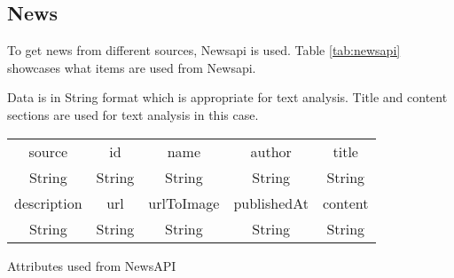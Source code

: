 \subsection{News}\label{News}

To get news from different sources, Newsapi \parencite{web:Newsapi} is used. Table \ref{tab:newsapi} showcases what items are used from Newsapi.

Data is in String format which is appropriate for text analysis. Title and content sections are used for text analysis in this case.

\begin{center}
\begin{tabular}{|c|c|c|c|c|}
    \hline
    \cellcolor{green} source & id & name & author & \cellcolor{green} title \\
    \cellcolor{green} String & String & String & String & \cellcolor{green} String\\
    \hline
    \cellcolor{green} description & \cellcolor{green} url & urlToImage & \cellcolor{green} publishedAt & \cellcolor{green}  content \\
    \cellcolor{green} String & \cellcolor{green} String & String & \cellcolor{green} String & \cellcolor{green} String\\
    \hline
\end{tabular}
\end{center}

\begin{table}[htbp]
\caption{Attributes used from NewsAPI}
\label{tab:newsapi}
\end{table}
